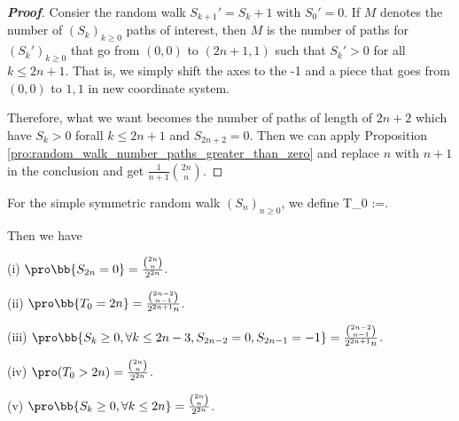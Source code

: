 \begin{proof}[\bf Proof]
Consier the random walk $S_{k+1}' = S_k+1$ with $S_0' = 0$. If $M$ denotes the number of $(S_k)_{k\geq 0}$ paths of interest, then $M$ is the number of paths for $(S_k')_{k\geq 0}$ that go from $(0,0)$ to $(2n+1,1)$ such that $S_k'>0$ for all $k\leq 2n+1$. That is, we simply shift the axes to the -1 and a piece that goes from $(0,0)$ to $1,1$ in new coordinate system.




Therefore, what we want becomes the number of paths of length of $2n+2$ which have $S_k >0$ forall $k\leq 2n+1$ and $S_{2n+2}=0$. Then we can apply Proposition \ref{pro:random_walk_number_paths_greater_than_zero} and replace $n$ with $n+1$ in the conclusion and get $\frac 1{n+1}\binom{2n}{n}$.
\end{proof}


\begin{proposition}
For the simple symmetric random walk $(S_n)_{n\geq 0}$, we define
\be
T_0 :=\inf{}.
\ee

Then we have
\ben
\item [(i)] $\pro\bb{S_{2n}=0} =  \frac{\binom{2n}{n}}{2^{2n}}$.
\item [(ii)] $\pro\bb{T_0 = 2n} = \frac{\binom{2n-2}{n-1}}{2^{2n+1}n}$.
\item [(iii)] $\pro\bb{S_k\geq 0,\forall k\leq 2n-3, S_{2n-2} =0, S_{2n-1}=-1} = \frac{\binom{2n-2}{n-1}}{2^{2n+1}n}$.
\item [(iv)] $\pro(T_0>2n) = \frac{\binom{2n}{n}}{2^{2n}}$.
\item [(v)] $\pro\bb{S_k\geq 0, \forall k\leq 2n} = \frac{\binom{2n}{n}}{2^{2n}}$.
\een
\end{proposition}

